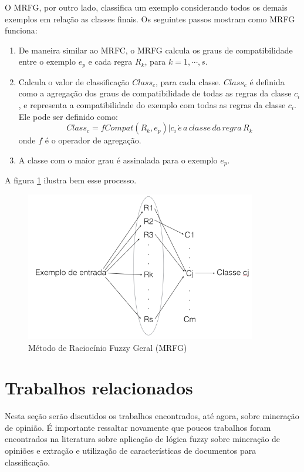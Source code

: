 \documentclass[template.tex]{subfiles}
\begin{document}
O MRFG, por outro lado, classifica um exemplo considerando todos os demais exemplos em relação as classes finais. Os seguintes passos mostram como MRFG funciona:

\begin{enumerate}
\item De maneira similar ao MRFC, o MRFG calcula os graus de compatibilidade entre o exemplo $e_p$ e cada regra $R_k$, para $k = 1, \cdots, s$.
\item Calcula o valor de classificação $Class_c$, para cada classe. $Class_c$ é definida como a agregação dos graus de compatibilidade de todas as regras da classe $c_i$, e representa a compatibilidade do exemplo com todas as regras da classe $c_i$. Ele pode ser definido como:
\begin{equation}
Class_c = f{Compat(R_k, e_p)|c_i \, \acute{e}\, a\, classe\, da\, regra\, R_k}
\end{equation}
onde $f$ é o operador de agregação.
\item A classe com o maior grau é assinalada para o exemplo $e_p$.
\end{enumerate}

A figura \ref{fig:mrfg} ilustra bem esse processo.

\begin{figure}[H]  
  \caption{Método de Raciocínio Fuzzy Geral (MRFG)}
  \label{fig:mrfg}
  \centering
    \includegraphics[width=0.9\textwidth]{mrfg}
\end{figure}

\section{Trabalhos relacionados}

Nesta seção serão discutidos os trabalhos encontrados, até agora, sobre mineração de opinião. É importante ressaltar novamente que poucos trabalhos foram encontrados na literatura sobre aplicação de lógica fuzzy sobre mineração de opiniões e extração e utilização de características de documentos para classificação. 
\end{document}
